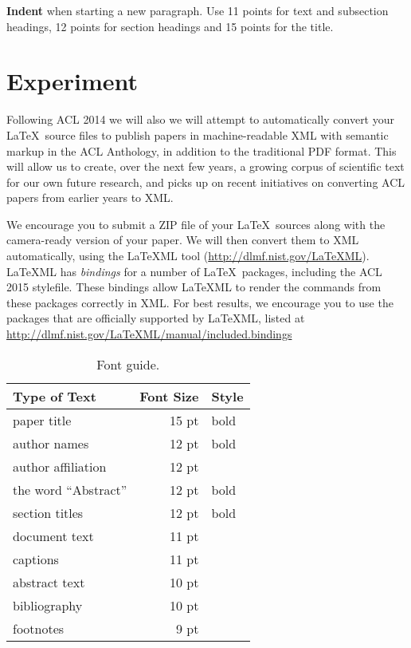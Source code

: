 \documentclass[11pt]{article}
\begin{document}
{\bf Indent} when starting a new paragraph. Use 11 points for text and 
subsection headings, 12 points for section headings and 15 points for
the title. 

\section{Experiment}

Following ACL 2014 we will also we will attempt to automatically convert 
your \LaTeX\ source files to publish papers in machine-readable 
XML with semantic markup in the ACL Anthology, in addition to the 
traditional PDF format.  This will allow us to create, over the next 
few years, a growing corpus of scientific text for our own future research, 
and picks up on recent initiatives on converting ACL papers from earlier 
years to XML. 

We encourage you to submit a ZIP file of your \LaTeX\ sources along
with the camera-ready version of your paper. We will then convert them
to XML automatically, using the LaTeXML tool
(\url{http://dlmf.nist.gov/LaTeXML}). LaTeXML has \emph{bindings} for
a number of \LaTeX\ packages, including the ACL 2015 stylefile. These
bindings allow LaTeXML to render the commands from these packages
correctly in XML. For best results, we encourage you to use the
packages that are officially supported by LaTeXML, listed at
\url{http://dlmf.nist.gov/LaTeXML/manual/included.bindings}

\begin{table}[h]
\begin{center}
\begin{tabular}{|l|rl|}
\hline \bf Type of Text & \bf Font Size & \bf Style \\ \hline
paper title & 15 pt & bold \\
author names & 12 pt & bold \\
author affiliation & 12 pt & \\
the word ``Abstract'' & 12 pt & bold \\
section titles & 12 pt & bold \\
document text & 11 pt  &\\
captions & 11 pt & \\
abstract text & 10 pt & \\
bibliography & 10 pt & \\
footnotes & 9 pt & \\
\hline
\end{tabular}
\end{center}
\caption{\label{font-table} Font guide. }
\end{table}
\end{document}
